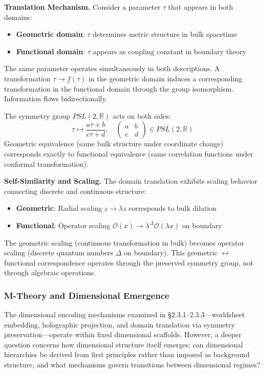 \textbf{Translation Mechanism.} Consider a parameter $\tau$ that appears in both domains:
\begin{itemize}
    \item \textbf{Geometric domain}: $\tau$ determines metric structure in bulk spacetime
    \item \textbf{Functional domain}: $\tau$ appears as coupling constant in boundary theory
\end{itemize}

The same parameter operates simultaneously in both descriptions. A transformation $\tau \to f(\tau)$ in the geometric domain induces a corresponding transformation in the functional domain through the group isomorphism. Information flows bidirectionally.

The symmetry group $PSL(2,\mathbb{R})$ acts on both sides:
\[
    \tau \mapsto \frac{a\tau + b}{c\tau + d}, \quad \begin{pmatrix} a & b \\ c & d \end{pmatrix} \in PSL(2,\mathbb{R})
\]
Geometric equivalence (same bulk structure under coordinate change) corresponds exactly to functional equivalence (same correlation functions under conformal transformation).

\textbf{Self-Similarity and Scaling.} The domain translation exhibits scaling behavior connecting discrete and continuous structure:
\begin{itemize}
    \item \textbf{Geometric}: Radial scaling $z \to \lambda z$ corresponds to bulk dilation
    \item \textbf{Functional}: Operator scaling $\mathcal{O}(x) \to \lambda^\Delta \mathcal{O}(\lambda x)$ on boundary
\end{itemize}

The geometric scaling (continuous transformation in bulk) becomes operator scaling (discrete quantum numbers $\Delta$ on boundary). This geometric $\leftrightarrow$ functional correspondence operates through the preserved symmetry group, not through algebraic operations.

\subsubsection{M-Theory and Dimensional Emergence}

The dimensional encoding mechanisms examined in \S 2.3.1–2.3.3—worldsheet embedding, holographic projection, and domain translation via symmetry preservation—operate within fixed dimensional scaffolds. However, a deeper question concerns how dimensional structure itself emerges: can dimensional hierarchies be derived from first principles rather than imposed as background structure, and what mechanisms govern transitions between dimensional regimes?

